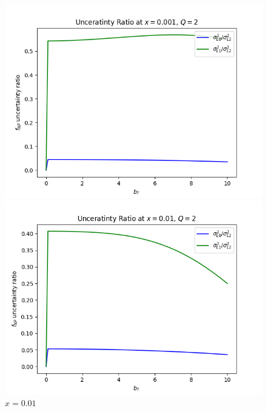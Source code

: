 \documentclass{article}
\begin{document}
\begin{itemize}
    \begin{figure}[H]
    \centering
    \begin{minipage}{0.45\textwidth}
        \centering
        \includegraphics[width=\textwidth]{Images/unc_ratios/unc_ratio_f_NP_Q_2_x_0.001.png}
        \caption{$x = 0.001$}
    \end{minipage}\hfill
    \begin{minipage}{0.45\textwidth}
        \centering
        \includegraphics[width=\textwidth]{Images/unc_ratios/unc_ratio_f_NP_Q_2_x_0.01.png}
        \caption{$x=0.01$}
    \end{minipage}
    \begin{minipage}{0.45\textwidth}
        \centering

\end{minipage}
\end{figure}
\end{itemize}
\end{document}
